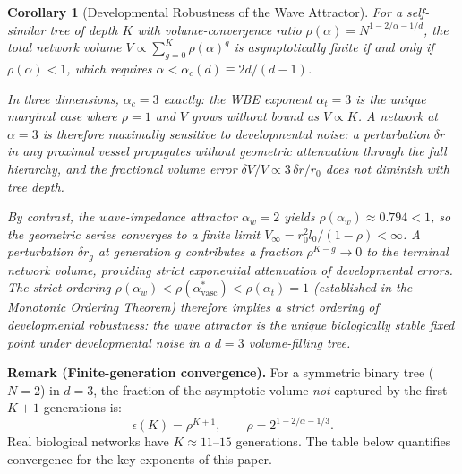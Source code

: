 \documentclass[11pt,a4paper]{article}
\newtheorem{corollary}[theorem]{Corollary}
\theoremstyle{remark}
\begin{document}
\begin{corollary}[Developmental Robustness of the Wave Attractor]
\label{cor:noise_robust}
For a self-similar tree of depth $K$ with volume-convergence ratio
$\rho(\alpha) = N^{1-2/\alpha-1/d}$, the total network volume
$V \propto \sum_{g=0}^{K}\rho(\alpha)^g$ is asymptotically finite
if and only if $\rho(\alpha) < 1$, which requires
$\alpha < \alpha_c(d) \equiv 2d/(d-1)$.

In three dimensions, $\alpha_c = 3$ exactly: the WBE exponent
$\alpha_t = 3$ is the unique marginal case where $\rho = 1$ and
$V$ grows without bound as $V \propto K$. A network at $\alpha = 3$
is therefore maximally sensitive to developmental noise: a
perturbation $\delta r$ in any proximal vessel propagates without
geometric attenuation through the full hierarchy, and the fractional
volume error $\delta V/V \propto 3\,\delta r/r_0$ does not diminish
with tree depth.

By contrast, the wave-impedance attractor $\alpha_w = 2$ yields
$\rho(\alpha_w) \approx 0.794 < 1$, so the geometric series converges
to a finite limit $V_\infty = r_0^2 l_0/(1-\rho) < \infty$. A
perturbation $\delta r_g$ at generation $g$ contributes a fraction
$\rho^{K-g} \to 0$ to the terminal network volume, providing strict
exponential attenuation of developmental errors. The strict ordering
$\rho(\alpha_w) < \rho(\alpha^*_{\mathrm{vasc}}) < \rho(\alpha_t) = 1$
(established in the Monotonic Ordering Theorem) therefore implies a
strict ordering of developmental robustness: the wave attractor is
the unique biologically stable fixed point under developmental noise
in a $d=3$ volume-filling tree.
\end{corollary}

\vspace{0.4em}
\noindent\textbf{Remark (Finite-generation convergence).}
For a symmetric binary tree ($N=2$) in $d=3$, the fraction of the asymptotic
volume \emph{not} captured by the first $K+1$ generations is:
\begin{equation}
\epsilon(K) = \rho^{K+1}, \qquad \rho = 2^{1-2/\alpha-1/3}.
\end{equation}
Real biological networks have $K \approx 11$--$15$ generations. The table below
quantifies convergence for the key exponents of this paper.
\end{document}
